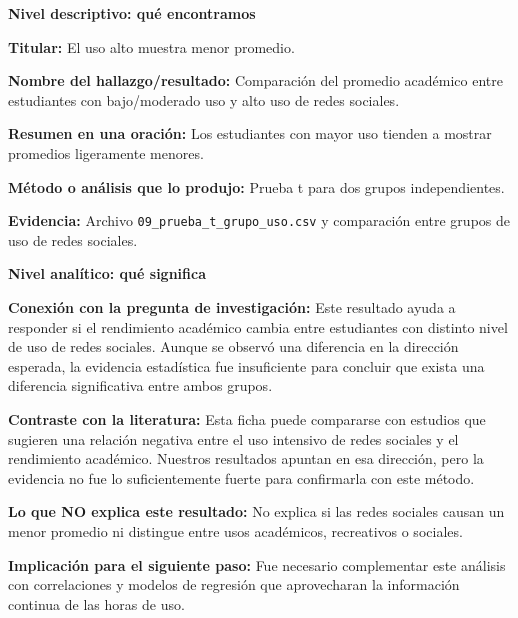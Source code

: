 \documentclass[12pt]{article}
\begin{document}
\begin{tcolorbox}[
colback=blue!5,
colframe=blue!75!black,
title=Ficha 1. Prueba t: bajo/moderado uso vs alto uso]

\textbf{Nivel descriptivo: qué encontramos}

\textbf{Titular:} El uso alto muestra menor promedio.

\textbf{Nombre del hallazgo/resultado:} Comparación del promedio académico entre estudiantes con bajo/moderado uso y alto uso de redes sociales.

\textbf{Resumen en una oración:} Los estudiantes con mayor uso tienden a mostrar promedios ligeramente menores.

\textbf{Método o análisis que lo produjo:} Prueba t para dos grupos independientes.

\textbf{Evidencia:} Archivo \texttt{09\_prueba\_t\_grupo\_uso.csv} y comparación entre grupos de uso de redes sociales.

\textbf{Nivel analítico: qué significa}

\textbf{Conexión con la pregunta de investigación:} Este resultado ayuda a responder si el rendimiento académico cambia entre estudiantes con distinto nivel de uso de redes sociales. Aunque se observó una diferencia en la dirección esperada, la evidencia estadística fue insuficiente para concluir que exista una diferencia significativa entre ambos grupos.

\textbf{Contraste con la literatura:} Esta ficha puede compararse con estudios que sugieren una relación negativa entre el uso intensivo de redes sociales y el rendimiento académico. Nuestros resultados apuntan en esa dirección, pero la evidencia no fue lo suficientemente fuerte para confirmarla con este método.

\textbf{Lo que NO explica este resultado:} No explica si las redes sociales causan un menor promedio ni distingue entre usos académicos, recreativos o sociales.

\textbf{Implicación para el siguiente paso:} Fue necesario complementar este análisis con correlaciones y modelos de regresión que aprovecharan la información continua de las horas de uso.
\end{tcolorbox}
\end{document}
